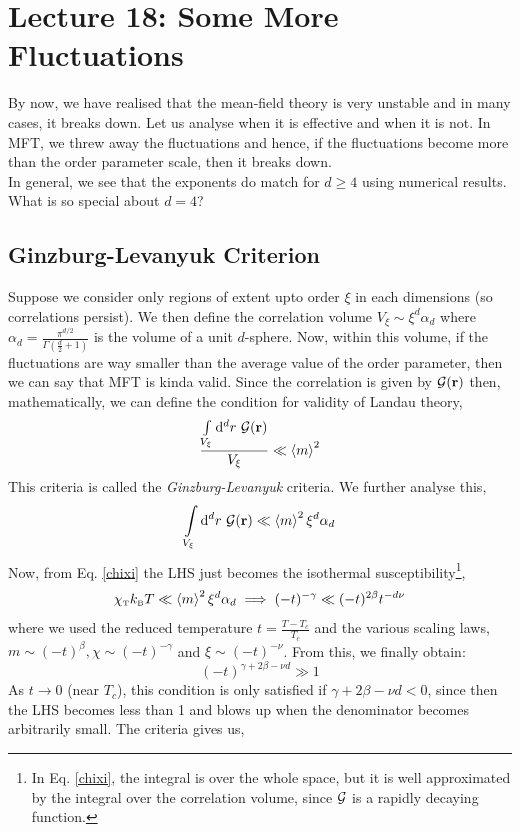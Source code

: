 \section*{Lecture 18: Some More Fluctuations}
By now, we have realised that the mean-field theory is very unstable and in many cases, it breaks down. Let us analyse when it is effective and when it is not. In MFT, we threw away the fluctuations and hence, if the fluctuations become more than the order parameter scale, then it breaks down.\\[0.2cm]
In general, we see that the exponents do match for $d\geq 4$ using numerical results. What is so special about $d=4$? 
\subsection{Ginzburg-Levanyuk Criterion}
Suppose we consider only regions of extent upto order $\xi$ in each dimensions (so correlations persist). We then define the correlation volume $V_\xi\sim \xi^d \alpha_d$ where $\alpha_d = \frac{\pi^{d/2}}{\Gamma(\frac{d}{2}+1)}$ is the volume of a unit $d$-sphere. Now, within this volume, if the fluctuations are way smaller than the average value of the order parameter, then we can say that MFT is kinda valid. Since the correlation is given by $\mathcal G(\vb{r})$ then, mathematically, we can define the condition for validity of Landau theory, 
\begin{equation}
    \frac{\int\limits_{V_\xi} \dd^d r \ \SG(\vb{r})}{V_\xi} \ll \avg{m}^2
\end{equation}
This criteria is called the \textit{Ginzburg-Levanyuk} criteria. We further analyse this, 
$$\int\limits_{V_\xi} \dd^d r \ \mathcal G(\vb{r}) \ll \left\langle m \right\rangle^2 \xi^d \alpha_d$$
Now, from Eq. \eqref{chixi} the LHS just becomes the isothermal susceptibility\footnote{In Eq. \eqref{chixi}, the integral is over the whole space, but it is well approximated by the integral over the correlation volume, since $\mathcal G$ is a rapidly decaying function.},
$$\chi_{\text{\tiny T}}k_{\text{\tiny B}} T \ll \left\langle m \right\rangle^2 \xi^d \alpha_d \implies (-t)^{-\gamma} \ll (-t)^{2\beta} t^{-d\nu}$$
where we used the reduced temperature $t= \frac{T-T_c}{T_c}$ and the various scaling laws, $m\sim (-t)^\beta, \chi\sim (-t)^{-\gamma}$ and $\xi \sim (-t)^{-\nu}$. From this, we finally obtain: 
\begin{equation}
    (-t)^{\gamma+2\beta-\nu d} \gg 1
\end{equation}
As $t\to 0$ (near $T_c$), this condition is only satisfied if $\gamma+2\beta-\nu d <0$, since then the LHS becomes less than 1 and blows up when the denominator becomes arbitrarily small. The criteria gives us, 
